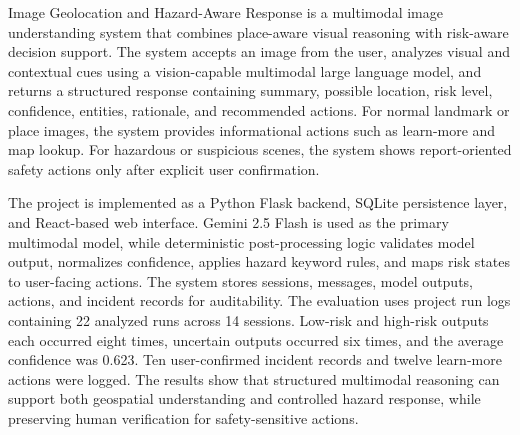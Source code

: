 {   \setlength{\parindent}{11mm} 
{ \setlength{\parindent}{0mm} } }

Image Geolocation and Hazard-Aware Response is a multimodal image understanding system that combines place-aware visual reasoning with risk-aware decision support. The system accepts an image from the user, analyzes visual and contextual cues using a vision-capable multimodal large language model, and returns a structured response containing summary, possible location, risk level, confidence, entities, rationale, and recommended actions. For normal landmark or place images, the system provides informational actions such as learn-more and map lookup. For hazardous or suspicious scenes, the system shows report-oriented safety actions only after explicit user confirmation.

The project is implemented as a Python Flask backend, SQLite persistence layer, and React-based web interface. Gemini 2.5 Flash is used as the primary multimodal model, while deterministic post-processing logic validates model output, normalizes confidence, applies hazard keyword rules, and maps risk states to user-facing actions. The system stores sessions, messages, model outputs, actions, and incident records for auditability. The evaluation uses project run logs containing 22 analyzed runs across 14 sessions. Low-risk and high-risk outputs each occurred eight times, uncertain outputs occurred six times, and the average confidence was 0.623. Ten user-confirmed incident records and twelve learn-more actions were logged. The results show that structured multimodal reasoning can support both geospatial understanding and controlled hazard response, while preserving human verification for safety-sensitive actions.
